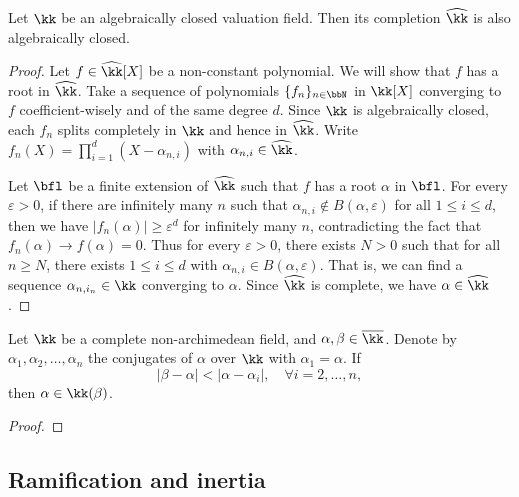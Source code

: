     \begin{proposition}\label{prop:completion_of_algebraically_closed_valuation_fields_is_algebraically_closed}
        Let \(\kk\) be an algebraically closed valuation field.
        Then its completion \(\widehat{\kk}\) is also algebraically closed.
    \end{proposition}
    \begin{proof}
        Let \(f \in \widehat{\kk}[X]\) be a non-constant polynomial.
        We will show that \(f\) has a root in \(\widehat{\kk}\).
        Take a sequence of polynomials \(\{f_n\}_{n \in \bbN}\) in \(\kk[X]\) converging to \(f\) coefficient-wisely and of the same degree \(d\).
        Since \(\kk\) is algebraically closed, each \(f_n\) splits completely in \(\kk\) and hence in \(\widehat{\kk}\).
        Write \(f_n(X) = \prod_{i=1}^d (X - \alpha_{n,i})\) with \(\alpha_{n,i} \in \widehat{\kk}\).

        Let \(\bfl\) be a finite extension of \(\widehat{\kk}\) such that \(f\) has a root \(\alpha\) in \(\bfl\).
        For every \(\varepsilon > 0\), if there are infinitely many \(n\) such that \(\alpha_{n,i} \notin B(\alpha, \varepsilon)\) for all \(1 \leq i \leq d\), 
        then we have \(|f_n(\alpha)| \geq \varepsilon^d\) for infinitely many \(n\), contradicting the fact that \(f_n(\alpha) \to f(\alpha) = 0\).
        Thus for every \(\varepsilon > 0\), there exists \(N > 0\) such that for all \(n \geq N\), there exists \(1 \leq i \leq d\) with \(\alpha_{n,i} \in B(\alpha, \varepsilon)\).
        That is, we can find a sequence \(\alpha_{n,i_n} \in \kk\) converging to \(\alpha\).
        Since \(\widehat{\kk}\) is complete, we have \(\alpha \in \widehat{\kk}\).
    \end{proof}

    \begin{theorem}\label{prop:krasner_lemma}
        Let \(\kk\) be a complete non-archimedean field, and \(\alpha, \beta \in \overline{\kk}\).
        Denote by \(\alpha_1, \alpha_2, \ldots, \alpha_n\) the conjugates of \(\alpha\) over \(\kk\) with \(\alpha_1 = \alpha\).
        If 
        \[ |\beta - \alpha| < |\alpha - \alpha_i|, \quad \forall i = 2, \ldots, n, \]
        then \(\alpha \in \kk(\beta)\).
    \end{theorem}
    \begin{proof}
    \end{proof}


\subsection{Ramification and inertia}

